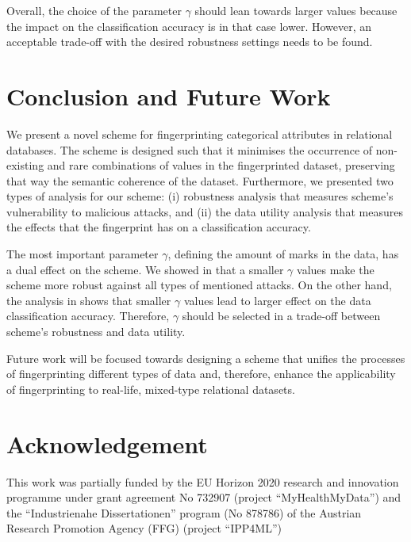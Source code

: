 \documentclass[runningheads]{llncs}
\begin{document}
Overall, the choice of the parameter $\gamma$ should lean towards larger values because the impact on the classification accuracy is in that case lower.
However, an acceptable trade-off with the desired robustness settings needs to be found.

\section{Conclusion and Future Work}\label{sec:conclusion&future-work}
We present a novel scheme for fingerprinting categorical attributes in relational databases.
The scheme is designed such that it minimises the occurrence of non-existing and rare combinations of values in the fingerprinted dataset, preserving that way the semantic coherence of the dataset.
Furthermore, we presented two types of analysis for our scheme: (i) robustness analysis that measures scheme's vulnerability to malicious attacks, and (ii) the data utility analysis that measures the effects that the fingerprint has on a classification accuracy.

The most important parameter $\gamma$, defining the amount of marks in the data, has a dual effect on the scheme. We showed in  that a smaller $\gamma$ values make the scheme more robust against all types of mentioned attacks.
On the other hand, the analysis in  shows that smaller $\gamma$ values lead to larger effect on the data classification accuracy. 
Therefore, $\gamma$ should be selected in a trade-off between scheme's robustness and data utility. 

Future work will be focused towards designing a scheme that unifies the processes of fingerprinting different types of data and, therefore, enhance the applicability of fingerprinting to real-life, mixed-type relational datasets.

\section*{Acknowledgement}
This work was partially funded by the EU Horizon 2020 research and innovation programme under grant agreement No 732907 
(project ``MyHealthMyData'') 
and the ``Industrienahe Dissertationen'' program (No 878786) of the Austrian Research Promotion Agency (FFG)
 (project ``IPP4ML'')

%
%
%


%
\end{document}
